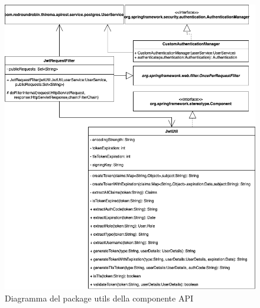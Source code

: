 		\begin{figure}[H]
			\centering
			\includegraphics[scale=0.550]{res/images/API/UtilsPackage.png}
			\caption{Diagramma del package utils della componente API}
			\label{Diagramma 11}
		\end{figure}
		
		\newpage
		
